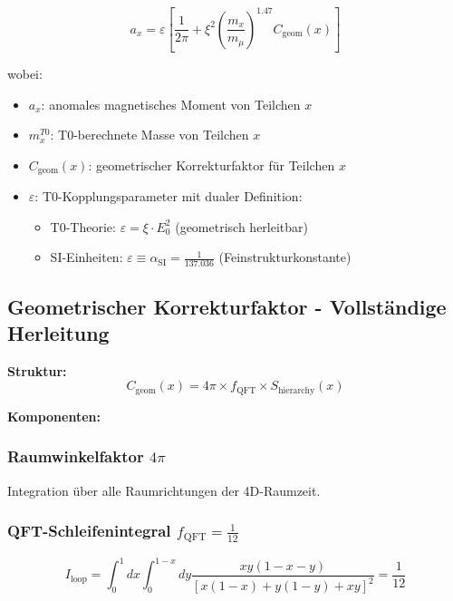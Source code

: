 \documentclass[12pt,a4paper]{article}
\numberwithin{equation}{section}
\newcommand{\xipar}{\xi}
\newcommand{\epsilonT}{\varepsilon}
\newcommand{\alphaSI}{\alpha_{\text{SI}}}
\newcommand{\Cgeom}{C_{\text{geom}}}
\newcommand{\fQFT}{f_{\text{QFT}}}
\newcommand{\Eo}{E_0}
\begin{document}
	\begin{equation}
		a_x = \epsilonT \left[ \frac{1}{2\pi} + \xipar^2 \left(\frac{m_x}{m_\mu}\right)^{1.47} \Cgeom(x) \right]
		\label{eq:universal_formula}
	\end{equation}
	
	wobei:
	\begin{itemize}
		\item $a_x$: anomales magnetisches Moment von Teilchen $x$
		\item $m_x^{T0}$: T0-berechnete Masse von Teilchen $x$
		\item $\Cgeom(x)$: geometrischer Korrekturfaktor für Teilchen $x$
		\item $\epsilonT$: T0-Kopplungsparameter mit dualer Definition:
		\begin{itemize}
			\item T0-Theorie: $\epsilonT = \xipar \cdot \Eo^2$ (geometrisch herleitbar)
			\item SI-Einheiten: $\epsilonT \equiv \alphaSI = \frac{1}{137.036}$ (Feinstrukturkonstante)
		\end{itemize}
	\end{itemize}
	
	\subsection{Geometrischer Korrekturfaktor - Vollständige Herleitung}
	
	\textbf{Struktur:}
	\begin{equation}
		\Cgeom(x) = 4\pi \times \fQFT \times S_{\text{hierarchy}}(x)
		\label{eq:cgeom_structure}
	\end{equation}
	
	\textbf{Komponenten:}
	
	\subsubsection{Raumwinkelfaktor $4\pi$}
	Integration über alle Raumrichtungen der 4D-Raumzeit.
	
	\subsubsection{QFT-Schleifenintegral $\fQFT = \frac{1}{12}$}
	\begin{equation}
		I_{\text{loop}} = \int_0^1 dx \int_0^{1-x} dy \frac{xy(1-x-y)}{[x(1-x) + y(1-y) + xy]^2} = \frac{1}{12}
		\label{eq:loop_integral}
	\end{equation}
	
\end{document}
